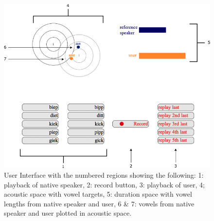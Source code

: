 \begin{figure}[H]
 \centering
 \includegraphics[scale=.42]{ui2.png}
 \caption{User Interface with the numbered regions showing the following: 1: playback of native speaker, 2: record button, 3: playback of user, 4; acoustic space with vowel targets, 5: duration space with vowel lengths from native speaker and user, 6 \& 7: vowels from native speaker and user plotted in acoustic space.}
 \label{fig:ui}
\end{figure}








